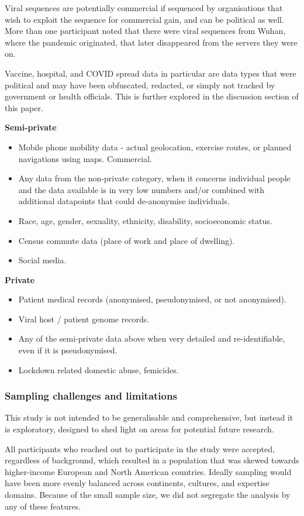 \documentclass{CUP-JNL-DAP}%
\begin{document}
Viral sequences are potentially commercial if sequenced by organisations that wish to exploit the sequence for commercial gain, and can be political as well. More than one participant noted that there were viral sequences from Wuhan, where the pandemic originated, that later disappeared from the servers they were on. 

Vaccine, hospital, and COVID spread data in particular are data types that were political and may have been obfuscated, redacted, or simply not tracked by government or health officials. This is further explored in the discussion section of this paper.

\textbf{Semi-private}
\begin{itemize}
\item Mobile phone mobility data - actual geolocation, exercise routes, or planned navigations using maps. Commercial. 
\item Any data from the non-private category, when it concerns individual people and the data available is in very low numbers and/or combined with additional datapoints that could de-anonymise individuals. 
\item Race, age, gender, sexuality, ethnicity, disability, socioeconomic status.
\item Census commute data (place of work and place of dwelling). 
\item Social media.
\end{itemize}

\textbf{Private}
\begin{itemize}
\item Patient medical records (anonymised, pseudonymised, or not anonymised).
\item Viral host / patient genome records.
\item Any of the semi-private data above when very detailed and re-identifiable, even if it is pseudonymised.
\item Lockdown related domestic abuse, femicides. 
\end{itemize}

\subsubsection{Sampling challenges and limitations}

This study is not intended to be generalisable and comprehensive, but instead it is exploratory, designed to shed light on areas for potential future research. 

All participants who reached out to participate in the study were accepted, regardless of background, which resulted in a population that was skewed towards higher-income European and North American countries. Ideally sampling would have been more evenly balanced across continents, cultures, and expertise domains. Because of the small sample size, we did not segregate the analysis by any of these features. 
\end{document}

